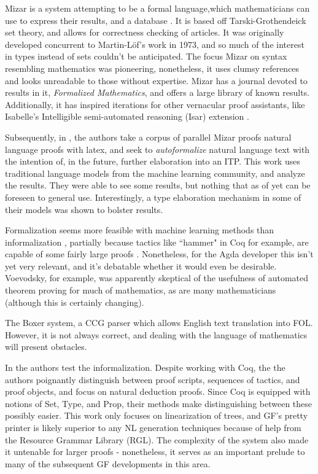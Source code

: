 Mizar is a system attempting to be a formal language,which mathematicians can
use to express their results, and a database \cite{rudnicki1992overview}. It is
based off Tarski-Grothendeick set theory, and allows for correctness checking of
articles. It was originally developed concurrent to Martin-Löf's work in 1973,
and so much of the interest in types instead of sets couldn't be anticipated.
The focus Mizar on syntax resembling mathematics was pioneering, nonetheless, it
uses clumsy references and looks unreadable to those without expertise. Mizar
has a journal devoted to results in it, \emph{Formalized Mathematics}, and
offers a large library of known results. Additionally, it has inspired
iterations for other vernacular proof assistants, like Isabelle's Intelligible semi-automated
reasoning (Isar) extension \cite{wenzel2004isabelle}.

Subsequently, in \cite{mlTrans}, the authors take a corpus of parallel Mizar proofs natural
language proofs with latex, and seek to \emph{autoformalize} natural language
text with the intention of, in the future, further elaboration into an ITP.
This work uses traditional language models from the machine learning community, and analyze
the results. They were able to see some results, but nothing that as of yet can
be foreseen to general use.  Interestingly, a type elaboration mechanism in some
of their models was shown to bolster results.

Formalization seems more feasible with machine learning methods than
informalization , partially because tactics like ``hammer" in Coq for example,
are capable of some fairly large proofs \cite{czajka2018hammer} . Nonetheless,
for the Agda developer this isn't yet very relevant, and it's debatable whether
it would even be desirable. Voevodsky, for example, was apparently skeptical of
the usefulness of automated theorem proving for much of mathematics, as are many
mathematicians (although this is certainly changing).

The Boxer system, a CCG parser \cite{bos-etal-2004-wide} which allows English
text translation into FOL. However, it is not always correct, and dealing with
the language of mathematics will present obstacles. 

In \cite{proofFrom} the authors test the informalization. Despite working with
Coq, the the authors poignantly distinguish between proof scripts, sequences of
tactics, and proof objects, and focus on natural deduction proofs. Since Coq is
equipped with notions of Set, Type, and Prop, their methods make distinguishing
between these possibly easier. This work only focuses on linearization of trees,
and GF's pretty printer is likely superior to any NL generation techniques
because of help from the Resource Grammar Library (RGL). The complexity of the system also made it
untenable for larger proofs - nonetheless, it serves as an important prelude to
many of the subsequent GF developments in this area.

